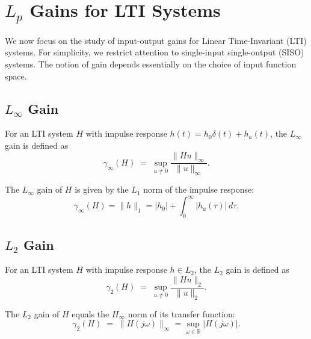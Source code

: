 \section{$L_p$ Gains for LTI Systems}

We now focus on the study of input-output gains for Linear Time-Invariant (LTI) systems.  
For simplicity, we restrict attention to single-input single-output (SISO) systems.  
The notion of gain depends essentially on the choice of input function space.

\subsection{$L_\infty$ Gain}

\begin{definition}
For an LTI system $H$ with impulse response $h(t) = h_0 \delta(t) + h_a(t)$, the $L_\infty$ gain is defined as
\begin{equation}
\gamma_\infty(H) \;=\; \sup_{u \neq 0} \frac{\|Hu\|_\infty}{\|u\|_\infty}.
\end{equation}
\end{definition}

\begin{theorem}
The $L_\infty$ gain of $H$ is given by the $L_1$ norm of the impulse response:
\begin{equation}
\gamma_\infty(H) = \|h\|_1 = |h_0| + \int_0^\infty |h_a(\tau)| \, d\tau.
\end{equation}
\end{theorem}

\subsection{$L_2$ Gain}

\begin{definition}[$L_2$ Gain]
For an LTI system $H$ with impulse response $h \in L_2$, the $L_2$ gain is defined as
\begin{equation}
\gamma_2(H) \;=\; \sup_{u \neq 0} \frac{\|Hu\|_2}{\|u\|_2}.
\end{equation}
\end{definition}

\begin{theorem}
The $L_2$ gain of $H$ equals the $H_\infty$ norm of its transfer function:
\begin{equation}
\gamma_2(H) \;=\; \|H(j\omega)\|_\infty 
= \sup_{\omega \in \mathbb{R}} |H(j\omega)|.
\end{equation}
\end{theorem}

